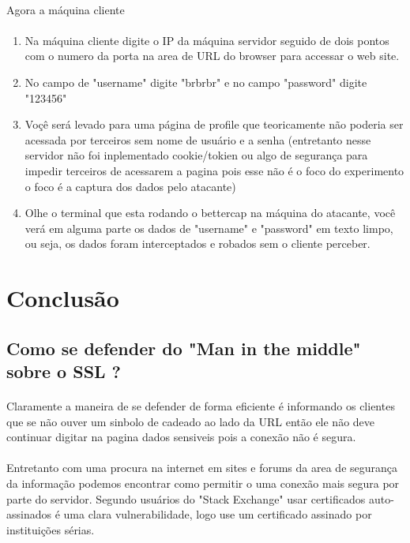 \documentclass{article}
\begin{document}
  \paragraph{}
  Agora a máquina cliente
  \paragraph{}

  \begin{enumerate}
    \item Na máquina cliente digite o IP da máquina servidor seguido de dois
    pontos com o numero da porta na area de URL do browser para accessar o web
    site.
    \item No campo de "username" digite "brbrbr" e no campo "password" digite
    "123456"
    \item Voçê será levado para uma página de profile que teoricamente não
    poderia ser acessada por terceiros sem nome de usuário e a senha (entretanto
    nesse servidor não foi inplementado cookie/tokien ou algo de segurança para
    impedir terceiros de acessarem a pagina pois esse não é o foco do experimento
    o foco é a captura dos dados pelo atacante)
    \item Olhe o terminal que esta rodando o bettercap na máquina do atacante,
    você verá em alguma parte os dados de "username" e "password" em texto limpo,
    ou seja, os dados foram interceptados e robados sem o cliente perceber.
  \end{enumerate}

  \newpage

  \section{Conclusão}
  \subsection{Como se defender do "Man in the middle" sobre o SSL ?}
  \paragraph{}
  Claramente a maneira de se defender de forma eficiente é informando os
  clientes que se não ouver um sinbolo de cadeado ao lado da URL então ele
  não deve continuar digitar na pagina dados sensiveis pois a conexão não é
  segura.
  \paragraph{}
  Entretanto com uma procura na internet em sites e forums da area de segurança
  da informação podemos encontrar como permitir o uma conexão mais segura por
  parte do servidor. Segundo usuários do "Stack Exchange" usar certificados
  auto-assinados é uma clara vulnerabilidade, logo use um certificado assinado
  por instituições sérias.
\end{document}
